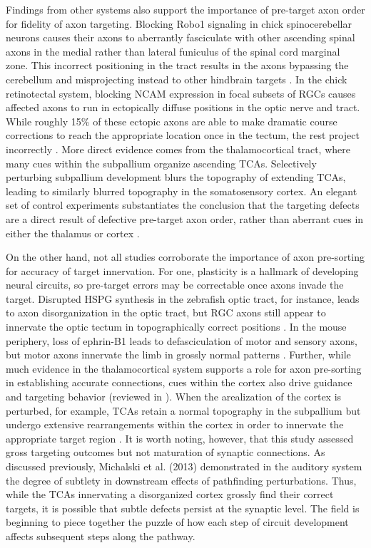 Findings from other systems also support the importance of pre-target axon order for fidelity of axon targeting. 
Blocking Robo1 signaling in chick spinocerebellar neurons causes their axons to aberrantly fasciculate with other ascending spinal axons in the medial rather than lateral funiculus of the spinal cord marginal zone. 
This incorrect positioning in the tract results in the axons bypassing the cerebellum and misprojecting instead to other hindbrain targets \cite{sakai2012axon}. 
In the chick retinotectal system, blocking NCAM expression in focal subsets of RGCs causes affected axons to run in ectopically diffuse positions in the optic nerve and tract. 
While roughly 15\% of these ectopic axons are able to make dramatic course corrections to reach the appropriate location once in the tectum, the rest project incorrectly \cite{thanos1984fiber}. 
More direct evidence comes from the thalamocortical tract, where many cues within the subpallium organize ascending TCAs. 
Selectively perturbing subpallium development blurs the topography of extending TCAs, leading to similarly blurred topography in the somatosensory cortex. 
An elegant set of control experiments substantiates the conclusion that the targeting defects are a direct result of defective pre-target axon order, rather than aberrant cues in either the thalamus or cortex \cite{lokmane2013sensory}. 

On the other hand, not all studies corroborate the importance of axon pre-sorting for accuracy of target innervation.
For one, plasticity is a hallmark of developing neural circuits, so pre-target errors may be correctable once axons invade the target. 
Disrupted HSPG synthesis in the zebrafish optic tract, for instance, leads to axon disorganization in the optic tract, but RGC axons still appear to innervate the optic tectum in topographically correct positions \cite{lee2004axon}. 
In the mouse periphery, loss of ephrin-B1 leads to defasciculation of motor and sensory axons, but motor axons innervate the limb in grossly normal patterns \cite{luxey2013eph}. 
Further, while much evidence in the thalamocortical system supports a role for axon pre-sorting in establishing accurate connections, cues within the cortex also drive guidance and targeting behavior (reviewed in \cite{garel2014inputs}). 
When the arealization of the cortex is perturbed, for example, TCAs retain a normal topography in the subpallium but undergo extensive rearrangements within the cortex in order to innervate the appropriate target region \cite{shimogori2005fibroblast}. 
It is worth noting, however, that this study assessed gross targeting outcomes but not maturation of synaptic connections. 
As discussed previously, Michalski et al. (2013) demonstrated in the auditory system the degree of subtlety in downstream effects of pathfinding perturbations. 
Thus, while the TCAs innervating a disorganized cortex grossly find their correct targets, it is possible that subtle defects persist at the synaptic level. 
The field is beginning to piece together the puzzle of how each step of circuit development affects subsequent steps along the pathway. 



